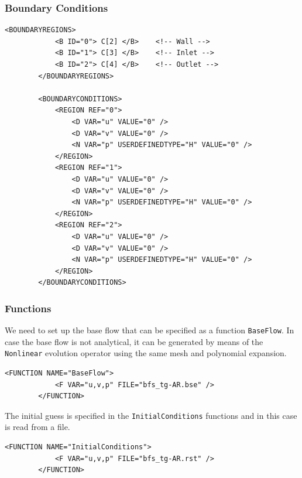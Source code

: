\subsubsection{Boundary Conditions}

      \begin{lstlisting}[style=XMLStyle]
 <BOUNDARYREGIONS>
            <B ID="0"> C[2] </B>    <!-- Wall -->
            <B ID="1"> C[3] </B>    <!-- Inlet -->
            <B ID="2"> C[4] </B>    <!-- Outlet -->
        </BOUNDARYREGIONS>

        <BOUNDARYCONDITIONS>
            <REGION REF="0">
                <D VAR="u" VALUE="0" />
                <D VAR="v" VALUE="0" />
                <N VAR="p" USERDEFINEDTYPE="H" VALUE="0" />
            </REGION>
            <REGION REF="1">
                <D VAR="u" VALUE="0" />
                <D VAR="v" VALUE="0" />
                <N VAR="p" USERDEFINEDTYPE="H" VALUE="0" />
            </REGION>
            <REGION REF="2">
                <D VAR="u" VALUE="0" />
                <D VAR="v" VALUE="0" />
                <N VAR="p" USERDEFINEDTYPE="H" VALUE="0" />
            </REGION>
        </BOUNDARYCONDITIONS>
                                \end{lstlisting}

\subsubsection{Functions}

We need to set up the base flow that can be specified as a function \texttt{BaseFlow}. In case the base flow is not analytical, it can be generated by means of the \texttt{Nonlinear} evolution operator using the same mesh and polynomial expansion.

      \begin{lstlisting}[style=XMLStyle]
<FUNCTION NAME="BaseFlow">
            <F VAR="u,v,p" FILE="bfs_tg-AR.bse" />
        </FUNCTION>
                                        \end{lstlisting}


The initial guess is specified in the \texttt{InitialConditions} functions and in this case is read from a file.

 \begin{lstlisting}[style=XMLStyle]
<FUNCTION NAME="InitialConditions">
            <F VAR="u,v,p" FILE="bfs_tg-AR.rst" />
        </FUNCTION>
                                        \end{lstlisting}


